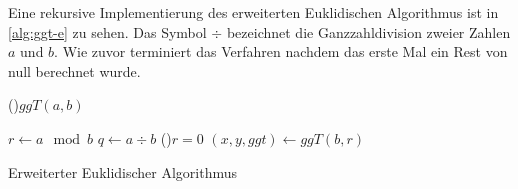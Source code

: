 \noindent
Eine rekursive Implementierung des erweiterten Euklidischen Algorithmus ist in
\autoref{alg:ggt-e} zu sehen. Das Symbol $\div$ bezeichnet die Ganzzahldivision
zweier Zahlen $a$ und $b$.
Wie zuvor terminiert das Verfahren nachdem das erste
Mal ein Rest von null berechnet wurde.
\begin{singlespace}
  \begin{algorithm}
    \DontPrintSemicolon
    \BlankLine
    \Fn(){$ggT(a,b)$}{
      $r \leftarrow a \mod{b}$\;
      $q \leftarrow a \div b$\;
      \If(){$r = 0$}{
      }
      $(x,y,ggt) \leftarrow ggT(b,r)$\;

    }
    \caption{Erweiterter Euklidischer Algorithmus}
    \label{alg:ggt-e}
  \end{algorithm}
\end{singlespace}
